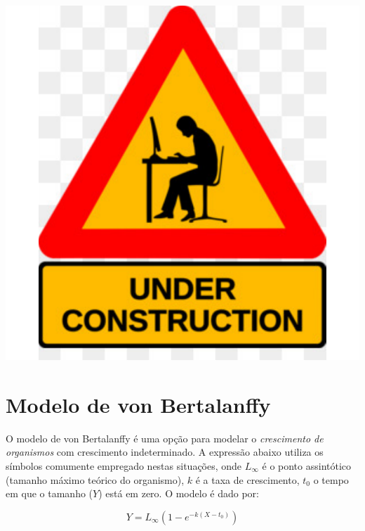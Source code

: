 \documentclass[
]{book}
\begin{document}
\begin{center}\includegraphics{probest-cambientais_files/figure-latex/unnamed-chunk-233-1} \end{center}

\hypertarget{modelo-de-von-bertalanffy}{%
\section{Modelo de von Bertalanffy}\label{modelo-de-von-bertalanffy}}

O modelo de von Bertalanffy é uma opção para modelar o \emph{crescimento de organismos} com crescimento indeterminado. A expressão abaixo utiliza os símbolos comumente empregado nestas situações, onde \(L_{\infty}\) é o ponto assintótico (tamanho máximo teórico do organismo), \(k\) é a taxa de crescimento, \(t_0\) o tempo em que o tamanho (\(Y\)) está em zero. O modelo é dado por:

\[Y = L_{\infty} (1 - e^{-k(X - t_0)})\]
\end{document}
